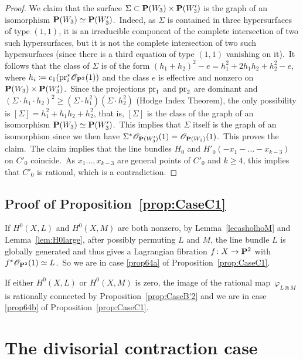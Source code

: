 \documentclass[12pt]{amsart}
\def\cO{\mathscr{O}}
\def\P{{\bf P}}
\def\phi{\varphi}
\def\isom{\simeq}
\def\cong{\isom}
\theoremstyle{remark}
\begin{document}
\begin{proof}
We claim that the surface $\Sigma\subset \P(  W_3)\times \P( W'_3)$ is  the graph of an isomorphism $\P(  W_3)\isom \P( W'_3)$.\ Indeed, as $\Sigma $ is  contained in three hypersurfaces of type $(1,1)$, it is an irreducible component of the complete intersection of two such hypersurfaces, but it is not the complete intersection of two such hypersurfaces (since there is a third equation of type $(1,1)$ vanishing on it).\  It follows that the class of $\Sigma$ is of the form $(h_1+h_2)^2-e=h_1^2+2h_1h_2+h_2^2-e$, where  $h_i\coloneqq c_1({\rm pr}_i^*\cO_{\P^2}(1))$ and the class $e$  is effective and nonzero on $\P(  W_3)\times \P( W'_3)$.\ Since the   projections ${\rm pr}_1$ and ${\rm pr}_2$ are dominant and $(\Sigma\cdot h_1\cdot h_2)^2\ge (\Sigma\cdot h_1^2)(\Sigma\cdot h_2^2)$ (Hodge Index Theorem), the only possibility is   $[\Sigma]=h_1^2+h_1h_2+h_2^2$, that is, $[\Sigma]$ is the class of the graph of an isomorphism $\P(  W_3)\cong \P( W'_3)$.\ This implies that $\Sigma$ itself is the graph of an isomorphism since we then have $\Sigma^*\cO_{\P( W'_3)}(1)= \cO_{\P( W_3)}(1)$.\ This proves the claim.\
The claim   implies that the
line bundles  $H_0$ and $H'_0(-x_1-\dots-x_{k-3})$ on $C'_0$ coincide.\ As $x_1\ldots,x_{k-3}$ are general points of   $C'_0$ and $k\geq 4$, this implies that $C'_0$ is rational, which is a contradiction.
\end{proof}


\subsection{Proof of Proposition~\ref{prop:CaseC1}}\label{proof}
If $H^0(X,L) $ and $H^0(X,M) $ are both nonzero, by Lemma~\ref{lecasholhoM} and Lemma~\ref{lem:H0large}, after possibly permuting $L$ and $M$, the line bundle $L$ is globally generated and thus gives a Lagrangian fibration $f\colon X\to \P^2$ with $f^*\cO_{\P^2}(1)\isom L$.\ So we are in case \ref{prop64a} of Proposition~\ref{prop:CaseC1}.

If either $H^0(X,L) $ or $H^0(X,M) $ is zero, the image of the rational map~$\phi_{L\otimes M}$ is rationally connected by Proposition~\ref{prop:CaseB'2} and we are in case \ref{prop64b} of Proposition~\ref{prop:CaseC1}.\



\section{The divisorial contraction case}\label{sec:DivisorialContraction}
\end{document}
